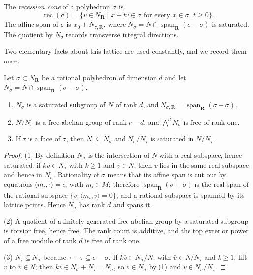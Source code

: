 The \emph{recession cone} of a polyhedron $\sigma$ is
\[
 \operatorname{rec}(\sigma)
 =\{v\in N_{\mathbf R}\mid x+tv\in\sigma
           \text{ for every }x\in\sigma,\ t\geq0\}.
\]
The affine span of $\sigma$ is $x_0+N_{\sigma,\mathbf R}$, where
$N_\sigma=N\cap\operatorname{span}_{\mathbf R}(\sigma-\sigma)$ is saturated.
The quotient by $N_\sigma$ records transverse integral directions.

Two elementary facts about this lattice are used constantly, and we record
them once.

\begin{lemma}
\label{lem:ch10-tangent-lattice}
Let $\sigma\subset N_{\mathbf R}$ be a rational polyhedron of dimension $d$
and let $N_\sigma=N\cap\operatorname{span}_{\mathbf R}(\sigma-\sigma)$.
\begin{enumerate}
\item $N_\sigma$ is a saturated subgroup of $N$ of rank $d$, and
      $N_{\sigma,\mathbf R}=\operatorname{span}_{\mathbf R}(\sigma-\sigma)$.
\item $N/N_\sigma$ is a free abelian group of rank $r-d$, and
      $\bigwedge^dN_\sigma$ is free of rank one.
\item If $\tau$ is a face of $\sigma$, then $N_\tau\subseteq N_\sigma$ and
      $N_\sigma/N_\tau$ is saturated in $N/N_\tau$.
\end{enumerate}
\end{lemma}

\begin{proof}
(1)  By definition $N_\sigma$ is the intersection of $N$ with a real subspace,
hence saturated: if $kv\in N_\sigma$ with $k\geq1$ and $v\in N$, then $v$ lies
in the same real subspace and hence in $N_\sigma$.  Rationality of $\sigma$
means that its affine span is cut out by equations $\langle m_i,\cdot\rangle
=c_i$ with $m_i\in M$; therefore
$\operatorname{span}_{\mathbf R}(\sigma-\sigma)$ is the real span of the
rational subspace $\{v:\langle m_i,v\rangle=0\}$, and a rational subspace is
spanned by its lattice points.  Hence $N_\sigma$ has rank $d$ and spans it.

(2)  A quotient of a finitely generated free abelian group by a saturated
subgroup is torsion free, hence free.  The rank count is additive, and the
top exterior power of a free module of rank $d$ is free of rank one.

(3)  $N_\tau\subseteq N_\sigma$ because $\tau-\tau\subseteq\sigma-\sigma$.
If $k\bar v\in N_\sigma/N_\tau$ with $\bar v\in N/N_\tau$ and $k\geq1$, lift
$\bar v$ to $v\in N$; then $kv\in N_\sigma+N_\tau=N_\sigma$, so $v\in
N_\sigma$ by (1) and $\bar v\in N_\sigma/N_\tau$.
\end{proof}

